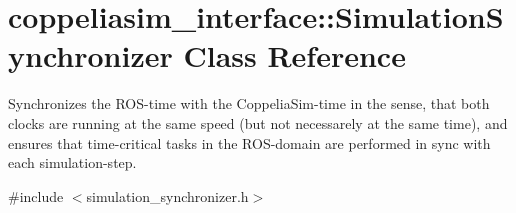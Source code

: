 \hypertarget{classcoppeliasim__interface_1_1SimulationSynchronizer}{}\section{coppeliasim\+\_\+interface\+:\+:Simulation\+Synchronizer Class Reference}
\label{classcoppeliasim__interface_1_1SimulationSynchronizer}


Synchronizes the R\+O\+S-\/time with the Coppelia\+Sim-\/time in the sense, that both \textquotesingle{}clocks\textquotesingle{} are running at the same speed (but not necessarely at the same time), and ensures that time-\/critical tasks in the R\+O\+S-\/domain are performed in sync with each simulation-\/step.  




{\ttfamily \#include $<$simulation\+\_\+synchronizer.\+h$>$}

